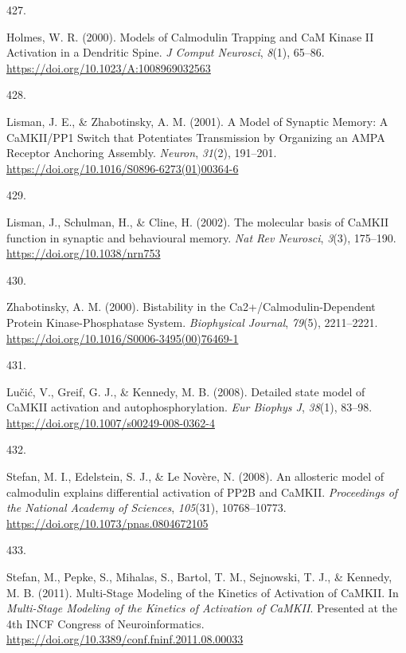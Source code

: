 \documentclass[
  11pt,
  letterpaper,
]{scrreprt}
\newlength{\cslhangindent}
\newlength{\csllabelwidth}
\newenvironment{CSLReferences}[2] %
 {\begin{list}{}{%
  \setlength{\itemindent}{0pt}
  \setlength{\leftmargin}{0pt}
  \setlength{\parsep}{0pt}
  \ifodd #1
   \setlength{\leftmargin}{\cslhangindent}
   \setlength{\itemindent}{-1\cslhangindent}
  \fi
  \setlength{\itemsep}{#2\baselineskip}}}
 {\end{list}}
\newcommand{\CSLLeftMargin}[1]{\parbox[t]{\csllabelwidth}{\strut#1\strut}}
\newcommand{\CSLRightInline}[1]{\parbox[t]{\linewidth - \csllabelwidth}{\strut#1\strut}}
\begin{document}
\begin{CSLReferences}{0}{0}
\CSLLeftMargin{427. }%
\CSLRightInline{Holmes, W. R. (2000). Models of {Calmodulin Trapping}
and {CaM Kinase II Activation} in a {Dendritic Spine}. \emph{J Comput
Neurosci}, \emph{8}(1), 65--86.
\url{https://doi.org/10.1023/A:1008969032563}}

\CSLLeftMargin{428. }%
\CSLRightInline{Lisman, J. E., \& Zhabotinsky, A. M. (2001). A {Model}
of {Synaptic Memory}: {A CaMKII}/{PP1 Switch} that {Potentiates
Transmission} by {Organizing} an {AMPA Receptor Anchoring Assembly}.
\emph{Neuron}, \emph{31}(2), 191--201.
\url{https://doi.org/10.1016/S0896-6273(01)00364-6}}

\CSLLeftMargin{429. }%
\CSLRightInline{Lisman, J., Schulman, H., \& Cline, H. (2002). The
molecular basis of {CaMKII} function in synaptic and behavioural memory.
\emph{Nat Rev Neurosci}, \emph{3}(3), 175--190.
\url{https://doi.org/10.1038/nrn753}}

\CSLLeftMargin{430. }%
\CSLRightInline{Zhabotinsky, A. M. (2000). Bistability in the
{Ca2}+/{Calmodulin-Dependent Protein Kinase-Phosphatase System}.
\emph{Biophysical Journal}, \emph{79}(5), 2211--2221.
\url{https://doi.org/10.1016/S0006-3495(00)76469-1}}

\CSLLeftMargin{431. }%
\CSLRightInline{Lučić, V., Greif, G. J., \& Kennedy, M. B. (2008).
Detailed state model of {CaMKII} activation and autophosphorylation.
\emph{Eur Biophys J}, \emph{38}(1), 83--98.
\url{https://doi.org/10.1007/s00249-008-0362-4}}

\CSLLeftMargin{432. }%
\CSLRightInline{Stefan, M. I., Edelstein, S. J., \& Le Novère, N.
(2008). An allosteric model of calmodulin explains differential
activation of {PP2B} and {CaMKII}. \emph{Proceedings of the National
Academy of Sciences}, \emph{105}(31), 10768--10773.
\url{https://doi.org/10.1073/pnas.0804672105}}

\CSLLeftMargin{433. }%
\CSLRightInline{Stefan, M., Pepke, S., Mihalas, S., Bartol, T. M.,
Sejnowski, T. J., \& Kennedy, M. B. (2011). Multi-{Stage Modeling} of
the {Kinetics} of {Activation} of {CaMKII}. In \emph{Multi-{Stage
Modeling} of the {Kinetics} of {Activation} of {CaMKII}}. Presented at
the 4th {INCF Congress} of {Neuroinformatics}.
\url{https://doi.org/10.3389/conf.fninf.2011.08.00033}}


\end{CSLReferences}
\end{document}
